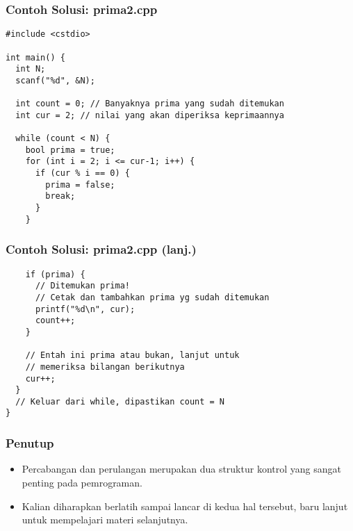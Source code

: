 \begin{frame}[fragile]
\frametitle{Contoh Solusi: prima2.cpp}
\begin{lstlisting}
#include <cstdio>

int main() {
  int N;
  scanf("%d", &N);

  int count = 0; // Banyaknya prima yang sudah ditemukan
  int cur = 2; // nilai yang akan diperiksa keprimaannya

  while (count < N) {
    bool prima = true;
    for (int i = 2; i <= cur-1; i++) {
      if (cur % i == 0) {
        prima = false;
        break;
      }
    }
\end{lstlisting}
\end{frame}

\begin{frame}[fragile]
\frametitle{Contoh Solusi: prima2.cpp (lanj.)}
\begin{lstlisting}
    if (prima) {
      // Ditemukan prima!
      // Cetak dan tambahkan prima yg sudah ditemukan
      printf("%d\n", cur);
      count++;
    }

    // Entah ini prima atau bukan, lanjut untuk
    // memeriksa bilangan berikutnya
    cur++;
  }
  // Keluar dari while, dipastikan count = N
}
\end{lstlisting}
\end{frame}

\begin{frame}
\frametitle{Penutup}
\begin{itemize}
  \item Percabangan dan perulangan merupakan dua struktur kontrol yang sangat penting pada pemrograman.
  \item Kalian diharapkan berlatih sampai lancar di kedua hal tersebut, baru lanjut untuk mempelajari materi selanjutnya.
\end{itemize}
\end{frame}


